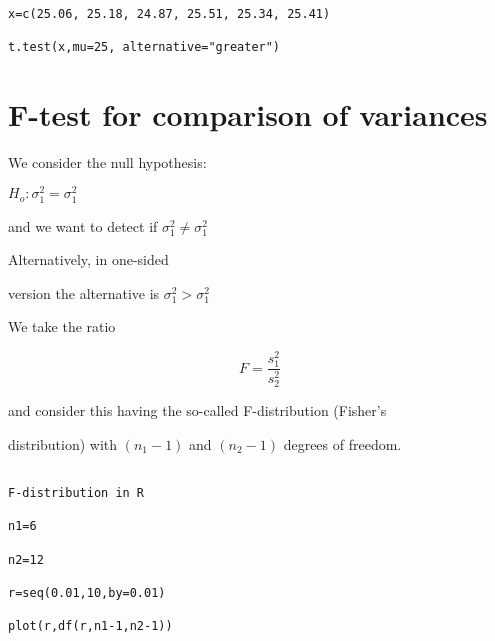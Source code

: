  



 



\begin{verbatim}

x=c(25.06, 25.18, 24.87, 25.51, 25.34, 25.41)

t.test(x,mu=25, alternative="greater")

\end{verbatim}

 



\section{F-test for comparison of variances}

 

We consider the null hypothesis:

$H_o : \sigma^2_1 = \sigma^2_1$

 

and we want to detect if $\sigma^2_1 \neq \sigma^2_1$

 

Alternatively, in one-sided

version the alternative is $\sigma^2_1 > \sigma^2_1$

 

We take the ratio

\[ F = \frac{s^2_1}{s^2_2} \]

 

and consider this having the so-called F-distribution (Fisher’s

distribution) with $(n_1-1)$ and $(n_2-1)$ degrees of freedom.



 

\begin{verbatim}

F-distribution in R

n1=6

n2=12

r=seq(0.01,10,by=0.01)

plot(r,df(r,n1-1,n2-1))

\end{verbatim}


